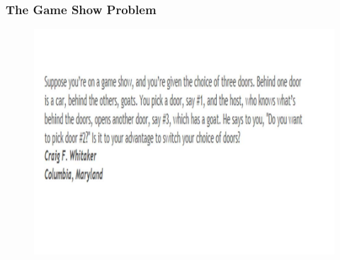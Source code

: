 \documentclass{beamer}
\begin{document}
	
	\begin{frame}
		\frametitle{The Game Show Problem}
		\begin{figure}
			\centering
			\includegraphics[width=1.1\linewidth]{MontyHall/Slide4}
	
		\end{figure}
		
	\end{frame}
\end{document}
